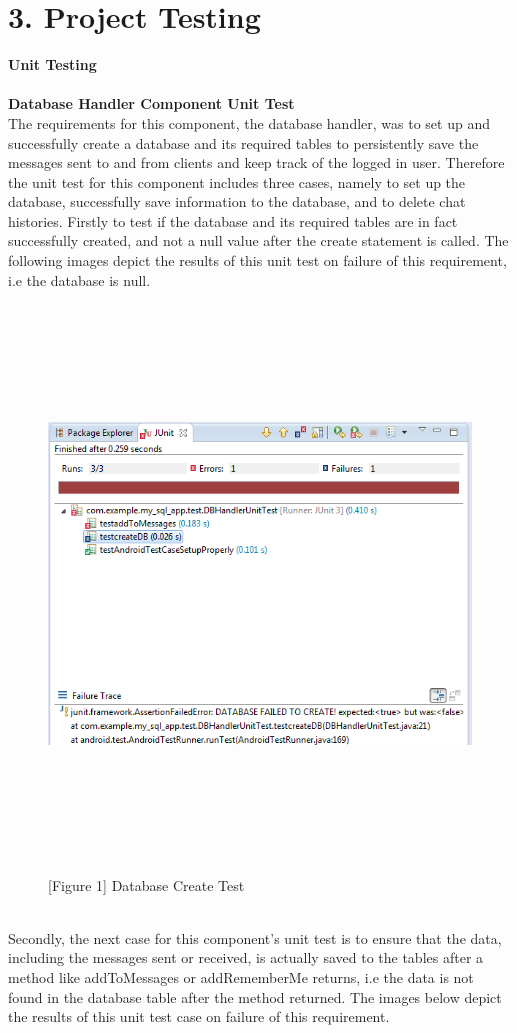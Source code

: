 \documentclass[29pt,a4paper]{moderncv}
\begin{document}
	\section*{3. Project Testing}
	\noindent \textbf{Unit Testing}\\
	\vspace{4mm}
	\\\textbf{Database Handler Component Unit Test}\\
	The requirements for this component, the database handler, was to set up and successfully create a database and its required tables to persistently save the messages sent to and from clients and keep track of the logged in user. Therefore the unit test for this component includes three cases, namely to set up the database, successfully save information to the database, and to delete chat histories.
	\parindent 5mm Firstly to test if the database and its required tables are in fact successfully created, and not a null value after the create statement is called. The following images depict the results of this unit test on failure of this requirement, i.e the database is null. \\
	
	\begin{figure}
				\\ \centering
				\\ \includegraphics[width=6.0in, height=5.0in]{./databasecreate.png}
				
				\\\caption{[Figure 1] Database Create Test}
	\end{figure}\\
\newpage	
	Secondly, the next case for this component’s unit test is to ensure that the data, including the messages sent or received, is actually saved to the tables after a method like addToMessages or addRememberMe returns, i.e the data is not found in the database table after the method returned. The images below depict the results of this unit test case on failure of this requirement.\\
	
\end{document}
